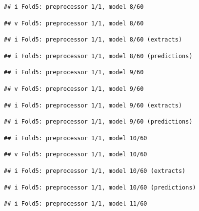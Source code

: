 \documentclass[
]{article}
\begin{document}
\begin{verbatim}
## i Fold5: preprocessor 1/1, model 8/60
\end{verbatim}

\begin{verbatim}
## v Fold5: preprocessor 1/1, model 8/60
\end{verbatim}

\begin{verbatim}
## i Fold5: preprocessor 1/1, model 8/60 (extracts)
\end{verbatim}

\begin{verbatim}
## i Fold5: preprocessor 1/1, model 8/60 (predictions)
\end{verbatim}

\begin{verbatim}
## i Fold5: preprocessor 1/1, model 9/60
\end{verbatim}

\begin{verbatim}
## v Fold5: preprocessor 1/1, model 9/60
\end{verbatim}

\begin{verbatim}
## i Fold5: preprocessor 1/1, model 9/60 (extracts)
\end{verbatim}

\begin{verbatim}
## i Fold5: preprocessor 1/1, model 9/60 (predictions)
\end{verbatim}

\begin{verbatim}
## i Fold5: preprocessor 1/1, model 10/60
\end{verbatim}

\begin{verbatim}
## v Fold5: preprocessor 1/1, model 10/60
\end{verbatim}

\begin{verbatim}
## i Fold5: preprocessor 1/1, model 10/60 (extracts)
\end{verbatim}

\begin{verbatim}
## i Fold5: preprocessor 1/1, model 10/60 (predictions)
\end{verbatim}

\begin{verbatim}
## i Fold5: preprocessor 1/1, model 11/60
\end{verbatim}
\end{document}
